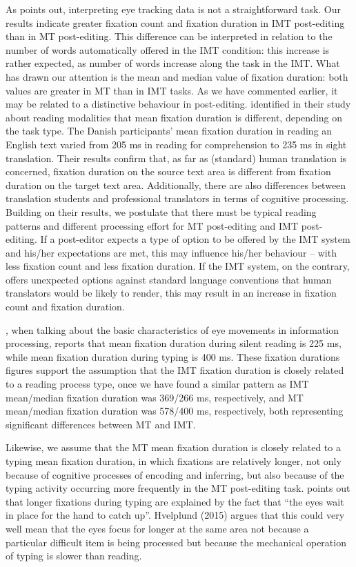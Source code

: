 \documentclass[output=paper]{langsci/langscibook}
\begin{document}
As \citet{obrien2008} points out, interpreting eye tracking data is not a straightforward task. Our results indicate greater fixation count and fixation duration in IMT post-editing than in MT post-editing. This difference can be interpreted in relation to the number of words automatically offered in the IMT condition: this increase is rather expected, as number of words increase along the task in the IMT. What has drawn our attention is the mean and median value of fixation duration: both values are greater in MT than in IMT tasks. As we have commented earlier, it may be related to a distinctive behaviour in post-editing. \citet{jakobsen2008} identified in their study about reading modalities that mean fixation duration is different, depending on the task type. The Danish participants' mean fixation duration in reading an English text varied from 205 ms in reading for comprehension to 235 ms in sight translation. Their results confirm that, as far as (standard) human translation is concerned, fixation duration on the source text area is different from fixation duration on the target text area. Additionally, there are also differences between translation students and professional translators in terms of cognitive processing. Building on their results, we postulate that there must be typical reading patterns and different processing effort for MT post-editing and IMT post-editing. If a post-editor expects a type of option to be offered by the IMT system and his/her expectations are met, this may influence his/her behaviour -- with less fixation count and less fixation duration. If the IMT system, on the contrary, offers unexpected options against standard language conventions that human translators would be likely to render, this may result in an increase in fixation count and fixation duration.


\citet{rayner1998}, when talking about the basic characteristics of eye movements in information processing, reports that mean fixation duration during silent reading is 225 ms, while mean fixation duration during typing is 400 ms. These fixation durations figures support the assumption that the IMT fixation duration is closely related to a reading process type, once we have found a similar pattern as IMT mean/median fixation duration was 369/266 ms, respectively, and MT mean/median fixation duration was 578/400 ms, respectively, both representing significant differences between MT and IMT.



Likewise, we assume that the MT mean fixation duration is closely related to a typing mean fixation duration, in which fixations are relatively longer, not only because of cognitive processes of encoding and inferring, but also because of the typing activity occurring more frequently in the MT post-editing task. \citet[396]{rayner1998} points out that longer fixations during typing are explained by the fact that ``the eyes wait in place for the hand to catch up''. Hvelplund (2015) argues that this could very well mean that the eyes focus for longer at the same area not because a particular difficult item is being processed but because the mechanical operation of typing is slower than reading.  
\end{document}
